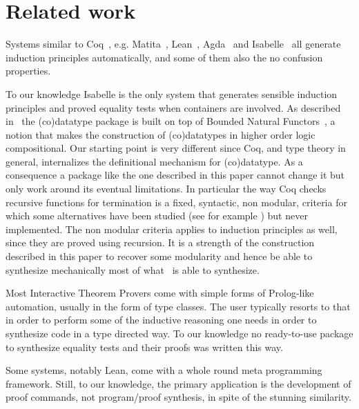 \documentclass[a4paper,UKenglish,cleveref, autoref]{lipics-v2019}
\begin{document}
\section{Related work} %
\label{sec:related}

Systems similar to Coq~\cite{the_coq_development_team_2018_1219885},
e.g. Matita~\cite{10.1007/978-3-642-22438-6_7},
Lean~\cite{10.1007/978-3-319-21401-6_26}, Agda~\cite{norell:thesis} and
Isabelle~\cite{Nipkow:2002:IPA:1791547} all generate
induction principles automatically, and some of them also the
no confusion properties. 

To our knowledge Isabelle is the only system that generates sensible induction
principles and proved equality tests when containers are involved. As described
in~\cite{10.1007/978-3-319-08970-6_7} the (co)datatype package is built on top
of Bounded Natural Functors~\cite{Traytel:2012:FCD:2358958.2359545}, a
notion that makes the construction of (co)datatypes in higher order logic
compositional.  Our starting point is very different since Coq, and type theory
in general, internalizes the definitional mechanism for (co)datatype. As
a consequence a package like the one described in this paper cannot change
it but only work around its eventual limitations.
In particular the way Coq checks recursive functions for termination is
a fixed, syntactic, non modular, criteria for which some alternatives
have been studied (see for example
\cite{DBLP:journals/lmcs/Abel08, DBLP:conf/lpar/BartheGP06})
but never implemented.
The non modular criteria applies to induction principles
as well, since they are proved using recursion.
It is a strength of the construction
described in this paper to recover some modularity and hence be able to
synthesize mechanically most of what~\cite{10.1007/978-3-319-08970-6_7} is
able to synthesize. 

Most Interactive Theorem Provers come with simple forms of Prolog-like
automation, usually in the form of type classes. The user typically
resorts to that in order to perform some of the inductive reasoning
one needs in order to synthesize code in a type directed way.
To our knowledge no ready-to-use package to synthesize equality tests
and their proofs was written this way.

Some systems, notably Lean, come with a whole round meta programming 
framework. Still, to our knowledge, the primary application is the
development of proof commands, not program/proof synthesis, in spite
of the stunning similarity.
\end{document}
